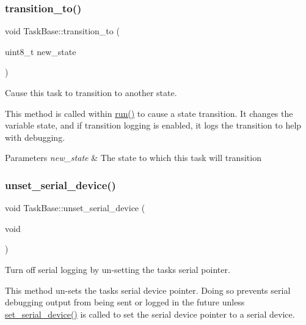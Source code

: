 \subsubsection{\texorpdfstring{transition\+\_\+to()}{transition\_to()}}
{\footnotesize\ttfamily void Task\+Base\+::transition\+\_\+to (\begin{DoxyParamCaption}\item[{uint8\+\_\+t}]{new\+\_\+state }\end{DoxyParamCaption})}



Cause this task to transition to another state. 

This method is called within {\ttfamily \mbox{\hyperlink{class_task_base_adcf6036ad9c860051ccf392ba5e7dbbc}{run()}}} to cause a state transition. It changes the variable {\ttfamily state}, and if transition logging is enabled, it logs the transition to help with debugging. 
\begin{DoxyParams}{Parameters}
{\em new\+\_\+state} & The state to which this task will transition \\
\hline
\end{DoxyParams}
\mbox{\label{class_task_base_a0e1cc480afef3708598b6b217b281a7b}} 
\subsubsection{\texorpdfstring{unset\+\_\+serial\+\_\+device()}{unset\_serial\_device()}}
{\footnotesize\ttfamily void Task\+Base\+::unset\+\_\+serial\+\_\+device (\begin{DoxyParamCaption}\item[{void}]{ }\end{DoxyParamCaption})\hspace{0.3cm}{\ttfamily [inline]}}



Turn off serial logging by un-\/setting the task\textquotesingle{}s serial pointer. 

This method un-\/sets the task\textquotesingle{}s serial device pointer. Doing so prevents serial debugging output from being sent or logged in the future unless {\ttfamily \mbox{\hyperlink{class_task_base_ad088ca82db29301b019b1efde85156be}{set\+\_\+serial\+\_\+device()}}} is called to set the serial device pointer to a serial device. \mbox{\label{class_task_base_a4e9fe49dbbf245e182abf6d17c9bd3df}} 
